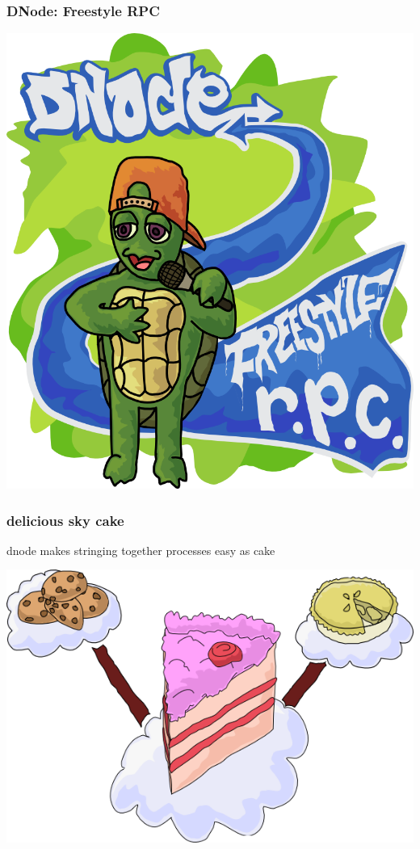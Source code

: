 \documentclass{beamer}
\begin{document}
\begin{frame}

\frametitle{DNode: Freestyle RPC}
\begin{center}
\includegraphics[scale=0.3]{images/freestyle_turtle.png}
\end{center}

\end{frame}

\begin{frame}
\begin{center}
\frametitle{delicious sky cake}
\huge

dnode makes stringing together processes easy as cake
\newline

\includegraphics[scale=0.5]{images/sky_cake.png}

\end{center}
\end{frame}
\end{document}
